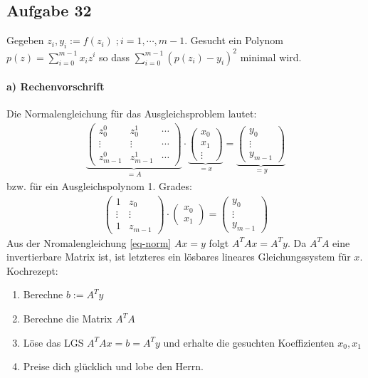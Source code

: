 \subsection*{Aufgabe 32}
Gegeben $z_i,  y_i := f(z_i) \; ; i = 1, \cdots , m-1$. Gesucht ein Polynom
$p(z) = \sum_{i = 0}^{m-1} x_i z^i$ so dass $\sum_{i = 0}^{m-1} (p(z_i) - y_i)^2$
minimal wird.

\paragraph*{a) Rechenvorschrift}
Die Normalengleichung für das Ausgleichsproblem lautet:
\begin{align}
\label{eq-norm}
\underbrace{
  \begin{pmatrix}z_0^0 & z_0^1 & \cdots \\ \vdots & \vdots  & \cdots\\ z_{m-1}^0 & z_{m-1}^1 &\cdots\end{pmatrix}}_{= A} \cdot
\underbrace{
  \begin{pmatrix}x_0 \\ x_1 \\ \vdots  \end{pmatrix}
  }_{= x} =
\underbrace{
  \begin{pmatrix}y_0 \\ \vdots \\y_{m-1}\end{pmatrix}
  }_{= y}
\end{align}
bzw. für ein Ausgleichspolynom 1. Grades:
\begin{align*}
  \begin{pmatrix}1 & z_0 \\ \vdots & \vdots \\ 1 & z_{m-1} \end{pmatrix} \cdot
  \begin{pmatrix}x_0 \\ x_1\end{pmatrix} =
  \begin{pmatrix}y_0 \\ \vdots \\y_{m-1}\end{pmatrix}
\end{align*}
Aus der Nromalengleichung \eqref{eq-norm} $A x = y$ folgt $A^T A x = A^T y$. Da
$A^T A$ eine invertierbare Matrix ist, ist letzteres ein lösbares lineares
Gleichungssystem für $x$. Kochrezept:
\begin{enumerate}
  \item Berechne $b := A^T y$
  \item Berechne die Matrix $A^T A$
  \item Löse das LGS $A^T A x = b = A^T y$ und erhalte die gesuchten Koeffizienten $x_0, x_1$
  \item Preise dich glücklich und lobe den Herrn.
\end{enumerate}

